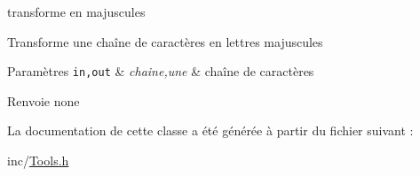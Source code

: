 transforme en majuscules 

Transforme une chaîne de caractères en lettres majuscules


\begin{DoxyParams}[1]{Paramètres}
\mbox{\tt in,out}  & {\em chaine,une} & chaîne de caractères \\
\hline
\end{DoxyParams}
\begin{DoxyReturn}{Renvoie}
none 
\end{DoxyReturn}


La documentation de cette classe a été générée à partir du fichier suivant :\begin{DoxyCompactItemize}
\item 
inc/\hyperlink{_tools_8h}{Tools.h}\end{DoxyCompactItemize}
